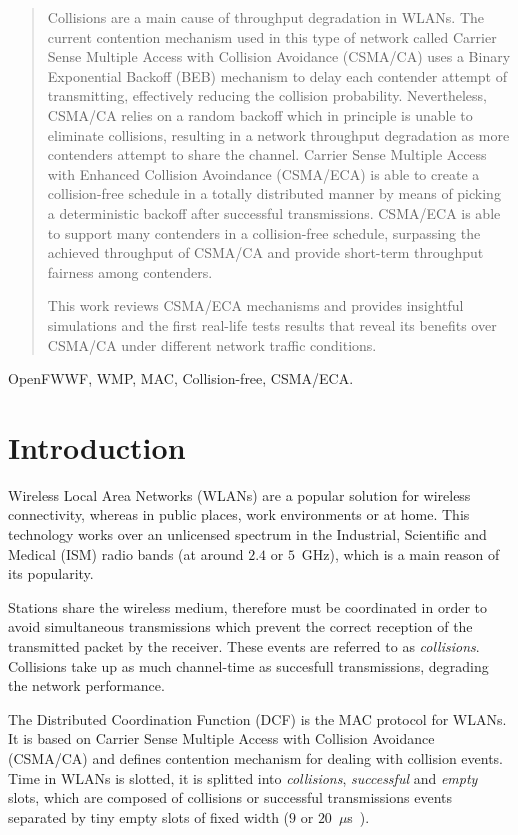 \documentclass[a4paper,journal]{IEEEtran}
\begin{document}
\begin{abstract}

\boldmath Collisions are a main cause of throughput degradation in WLANs. The current contention mechanism used in this type of network called Carrier Sense Multiple Access with Collision Avoidance (CSMA/CA) uses a Binary Exponential Backoff (BEB) mechanism to delay each contender attempt of transmitting, effectively reducing the collision probability. Nevertheless, CSMA/CA relies on a random backoff which in principle is unable to eliminate collisions, resulting in a network throughput degradation as more contenders attempt to share the channel. Carrier Sense Multiple Access with Enhanced Collision Avoindance (CSMA/ECA) is able to create a collision-free schedule in a totally distributed manner by means of picking a deterministic backoff after successful transmissions. CSMA/ECA is able to support many contenders in a collision-free schedule, surpassing the achieved throughput of CSMA/CA and provide short-term throughput fairness among contenders.

This work reviews CSMA/ECA mechanisms and provides insightful simulations and the first real-life tests results that reveal its benefits over CSMA/CA under different network traffic conditions.

\end{abstract}

\begin{IEEEkeywords}
OpenFWWF, WMP, MAC, Collision-free, CSMA/ECA.
\end{IEEEkeywords}

\section{Introduction}\label{introduction}
Wireless Local Area Networks (WLANs) are a popular solution for wireless connectivity, whereas in public places, work environments or at home. This technology works over an unlicensed spectrum in the Industrial, Scientific and Medical (ISM) radio bands (at around $2.4$ or $5$~GHz), which is a main reason of its popularity. 

Stations share the wireless medium, therefore must be coordinated in order to avoid simultaneous transmissions which prevent the correct reception of the transmitted packet by the receiver. These events are referred to as \emph{collisions}. Collisions take up as much channel-time as succesfull transmissions, degrading the network performance.

The Distributed Coordination Function (DCF) is the MAC protocol for WLANs. It is based on Carrier Sense Multiple Access with Collision Avoidance (CSMA/CA) and defines contention mechanism for dealing with collision events. Time in WLANs is slotted, it is splitted into \emph{collisions}, \emph{successful} and \emph{empty} slots, which are composed of collisions or successful transmissions events separated by tiny empty slots of fixed width ($9$ or $20$~$\mu$s~\cite{802Standards}).
\end{document}
